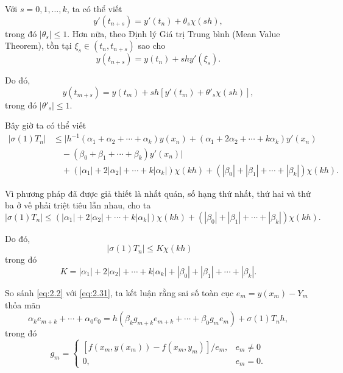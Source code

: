 Với $s = 0, 1, \dots, k$, ta có thể viết
\begin{equation*}
    y'(t_{n+s}) = y'(t_n) + \theta_s \chi(sh) ,
\end{equation*}
trong đó $|\theta_s| \le 1$. Hơn nữa, theo Định lý Giá trị Trung bình (Mean Value Theorem), tồn tại $\xi_s \in (t_n, t_{n+s})$ sao cho
\begin{equation*}
    y(t_{n+s}) = y(t_n) + sh y'(\xi_s) .
\end{equation*}

Do đó,
\begin{equation*}
    y(t_{m+s}) = y(t_m) + sh \left[ y'(t_m) + \theta'_s \chi(sh) \right] ,
\end{equation*}
trong đó $|\theta'_s| \le 1$.

Bây giờ ta có thể viết
\begin{align*}
|\sigma(1)T_n| &\le \Big| h^{-1}(\alpha_1 + \alpha_2 + \cdots + \alpha_k)y(x_n) + (\alpha_1 + 2\alpha_2 + \cdots + k\alpha_k)y'(x_n) \\
&\quad - (\beta_0 + \beta_1 + \cdots + \beta_k)y'(x_n) \Big| \\
&\quad + (|\alpha_1| + 2|\alpha_2| + \cdots + k|\alpha_k|)\chi(kh) + (|\beta_0| + |\beta_1| + \cdots + |\beta_k|)\chi(kh) .
\end{align*}

Vì phương pháp đã được giả thiết là nhất quán, số hạng thứ nhất, thứ hai và thứ ba ở vế phải triệt tiêu lẫn nhau, cho ta
\begin{equation*}
    |\sigma(1)T_n| \le (|\alpha_1| + 2|\alpha_2| + \cdots + k|\alpha_k|)\chi(kh) + (|\beta_0| + |\beta_1| + \cdots + |\beta_k|)\chi(kh) .
\end{equation*}

Do đó,
\begin{equation}
    |\sigma(1)T_n| \le K \chi(kh) \qquad \tag{2.32} \label{eq:2.32}
\end{equation}
trong đó
\begin{equation*}
    K = |\alpha_1| + 2|\alpha_2| + \cdots + k|\alpha_k| + |\beta_0| + |\beta_1| + \cdots + |\beta_k| .
\end{equation*}

So sánh \eqref{eq:2.2} với \eqref{eq:2.31}, ta kết luận rằng sai số toàn cục $e_m = y(x_m) - Y_m$ thỏa mãn
\begin{equation*}
    \alpha_k e_{m+k} + \cdots + \alpha_0 e_0 = h(\beta_k g_{m+k} e_{m+k} + \cdots + \beta_0 g_m e_m) + \sigma(1) T_n h ,
\end{equation*}
trong đó
\begin{equation*}
    g_m = 
    \begin{cases}
    [f(x_m, y(x_m)) - f(x_m, y_m)] / e_m , & e_m \ne 0 \\
    0 , & e_m = 0 .
    \end{cases}
\end{equation*}

